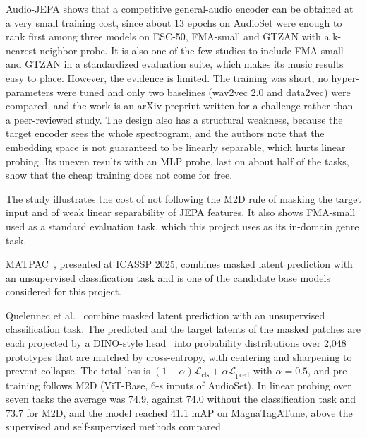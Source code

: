\documentclass{FastFyp}
\begin{document}
\lrcritical
Audio-JEPA shows that a competitive general-audio encoder can be obtained at a very small training cost, since about 13 epochs on AudioSet were enough to rank first among three models on ESC-50, FMA-small and GTZAN with a k-nearest-neighbor probe. It is also one of the few studies to include FMA-small and GTZAN in a standardized evaluation suite, which makes its music results easy to place. However, the evidence is limited. The training was short, no hyper-parameters were tuned and only two baselines (wav2vec 2.0 and data2vec) were compared, and the work is an arXiv preprint written for a challenge rather than a peer-reviewed study. The design also has a structural weakness, because the target encoder sees the whole spectrogram, and the authors note that the embedding space is not guaranteed to be linearly separable, which hurts linear probing. Its uneven results with an MLP probe, last on about half of the tasks, show that the cheap training does not come for free.

\lrrelation
The study illustrates the cost of not following the M2D rule of masking the target input and of weak linear separability of JEPA features. It also shows FMA-small used as a standard evaluation task, which this project uses as its in-domain genre task.

MATPAC~\cite{ref:Quelennec:2025matpac}, presented at ICASSP 2025, combines masked latent prediction with an unsupervised classification task and is one of the candidate base models considered for this project.

\lrsummary
Quelennec et al.~\cite{ref:Quelennec:2025matpac} combine masked latent prediction with an unsupervised classification task. The predicted and the target latents of the masked patches are each projected by a DINO-style head~\cite{ref:Caron:2021dino} into probability distributions over 2,048 prototypes that are matched by cross-entropy, with centering and sharpening to prevent collapse. The total loss is $(1-\alpha)\mathcal{L}_{\mathrm{cls}}+\alpha\mathcal{L}_{\mathrm{pred}}$ with $\alpha=0.5$, and pre-training follows M2D (ViT-Base, 6-s inputs of AudioSet). In linear probing over seven tasks the average was 74.9, against 74.0 without the classification task and 73.7 for M2D, and the model reached 41.1 mAP on MagnaTagATune, above the supervised and self-supervised methods compared.
\end{document}
